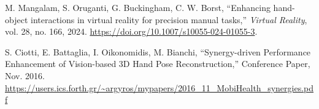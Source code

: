 \documentclass[11pt]{llncs}
\begin{document}
\vspace{1em}
\noindent

\begin{thebibliography}{1}

M. Mangalam, S. Oruganti, G. Buckingham, C. W. Borst,
``Enhancing hand-object interactions in virtual reality for precision manual tasks,''
\textit{Virtual Reality},
vol. 28, no. 166, 2024.
\url{https://doi.org/10.1007/s10055-024-01055-3}.

S. Ciotti, E. Battaglia, I. Oikonomidis, M. Bianchi,
``Synergy-driven Performance Enhancement of Vision-based 3D Hand Pose Reconstruction,''
Conference Paper, Nov. 2016.
\url{https://users.ics.forth.gr/~argyros/mypapers/2016_11_MobiHealth_synergies.pdf}

\end{thebibliography}
\end{document}
